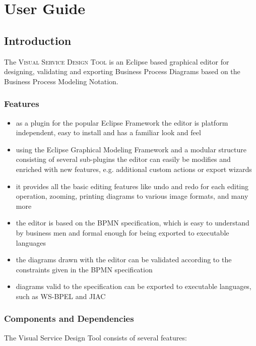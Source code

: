 \chapter{User Guide}

\section{Introduction}

The \textsc{Visual Service Design Tool} is an Eclipse based graphical editor for designing, validating and exporting Business Process Diagrams based on the Business Process Modeling Notation.

\subsection{ Features }

\begin{itemize}
\item as a plugin for the popular Eclipse Framework the editor is platform independent, easy to install and has a familiar look and feel
\item using the Eclipse Graphical Modeling Framework and a modular structure consisting of several sub-plugins the editor can easily be modifies and enriched with new features, e.g. additional custom actions or export wizards
\item it provides all the basic editing features like undo and redo for each editing operation, zooming, printing diagrams to various image formats, and many more
\item the editor is based on the BPMN specification, which is easy to understand by business men and formal enough for being exported to executable languages
\item the diagrams drawn with the editor can be validated according to the constraints given in the BPMN specification
\item diagrams valid to the specification can be exported to executable languages, such as WS-BPEL and JIAC
\end{itemize}



\subsection{Components and Dependencies}

The Visual Service Design Tool consists of several features:

